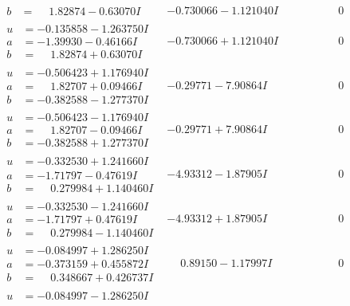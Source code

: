 \documentclass[1p]{elsarticle_modified}
\theoremstyle{definition}
\begin{document}
$$\begin{array}{c|c|c}
\begin{aligned}
b &= \phantom{-}1.82874 - 0.63070 I\end{aligned}
 & -0.730066 - 1.121040 I & \phantom{-0.000000 } 0 \\ \hline\begin{aligned}
u &= -0.135858 - 1.263750 I \\
a &= -1.39930 - 0.46166 I \\
b &= \phantom{-}1.82874 + 0.63070 I\end{aligned}
 & -0.730066 + 1.121040 I & \phantom{-0.000000 } 0 \\ \hline\begin{aligned}
u &= -0.506423 + 1.176940 I \\
a &= \phantom{-}1.82707 + 0.09466 I \\
b &= -0.382588 - 1.277370 I\end{aligned}
 & -0.29771 - 7.90864 I & \phantom{-0.000000 } 0 \\ \hline\begin{aligned}
u &= -0.506423 - 1.176940 I \\
a &= \phantom{-}1.82707 - 0.09466 I \\
b &= -0.382588 + 1.277370 I\end{aligned}
 & -0.29771 + 7.90864 I & \phantom{-0.000000 } 0 \\ \hline\begin{aligned}
u &= -0.332530 + 1.241660 I \\
a &= -1.71797 - 0.47619 I \\
b &= \phantom{-}0.279984 + 1.140460 I\end{aligned}
 & -4.93312 - 1.87905 I & \phantom{-0.000000 } 0 \\ \hline\begin{aligned}
u &= -0.332530 - 1.241660 I \\
a &= -1.71797 + 0.47619 I \\
b &= \phantom{-}0.279984 - 1.140460 I\end{aligned}
 & -4.93312 + 1.87905 I & \phantom{-0.000000 } 0 \\ \hline\begin{aligned}
u &= -0.084997 + 1.286250 I \\
a &= -0.373159 + 0.455872 I \\
b &= \phantom{-}0.348667 + 0.426737 I\end{aligned}
 & \phantom{-}0.89150 - 1.17997 I & \phantom{-0.000000 } 0 \\ \hline\begin{aligned}
u &= -0.084997 - 1.286250 I \\

\end{aligned}
\end{array}$$
\end{document}
